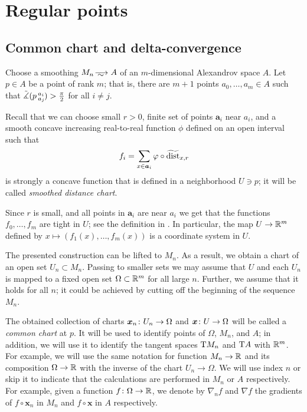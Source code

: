 \section{Regular points}\label{sec:ref}

\subsection{Common chart and delta-convergence}\label{subsec:chart+delta}

Choose a smoothing $M_n\smooths{} A$ of an $m$-dimensional Alexandrov space $A$.
Let $p\in A$ be a point of rank $m$; that is, there are $m+1$ points $a_0,\dots, a_m\in A$ such that 
$\tilde\measuredangle(p\,{}^{a_i}_{a_j}\hspace{-0.2ex})>\tfrac\pi2$ for all $i\ne j$.

Recall \cite[Sec. 7]{petrunin-conc} that we can choose small $r>0$,
finite set of points $\bm{a}_i$ near $a_i$,
and a smooth concave increasing real-to-real function $\phi$ defined on an open interval such that 
\[f_i=\sum_{x\in \bm{a}_i}\varphi\circ\widetilde{\operatorname{\rm dist}}_{x,r}\]
is strongly a concave function that is defined in a neighborhood $U\ni p$;
it will be called \emph{smoothed distance chart}.

Since $r$ is small, and all points in $\bm{a}_i$ are near $a_i$ we get that the functions $f_0, \dots, f_m$ are tight in $U$; see the definition in \cite{petrunin-conc}.
In particular, the map $U\to\mathbb{R}^m$ defined by $x\mapsto (f_1(x),\dots,f_m(x))$ is a coordinate system in $U$.

The presented construction can be lifted to $M_n$.
As a result, we obtain a chart of an open set $U_n\subset M_n$.
Passing to smaller sets we may assume that $U$ and each $U_n$ is mapped to a fixed open set $\Omega\subset\mathbb{R}^m$ for all large $n$.
Further, we assume that it holds for all $n$; it could be achieved by cutting off the beginning of the sequence $M_n$.

The obtained collection of charts $\bm{x}_n\:U_n\zz\to \Omega$ and $\bm{x}\:U\zz\to \Omega$ will be called a \emph{common chart} at $p$.
It will be used to identify points of $\Omega$, $M_n$, and $A$; 
in addition, we will use it to identify the tangent spaces $\mathrm{T} M_n$ and $\mathrm{T} A$ with $\mathbb{R}^m$.
For example, we will use the same notation for function $M_n\to \mathbb{R}$ and its composition $\Omega\to \mathbb{R}$ with the inverse of the chart $U_n\to \Omega$.
We will use index $n$ or skip it to indicate that the calculations are performed in $M_n$ or $A$ respectively.
For example, given a function $f\colon\Omega\to \mathbb{R}$, we denote by $\nabla_nf$ and $\nabla f$ the gradients of $f\circ \bm{x}_n$ in $M_n$ and $f\circ \bm{x}$ in $A$ respectively.

